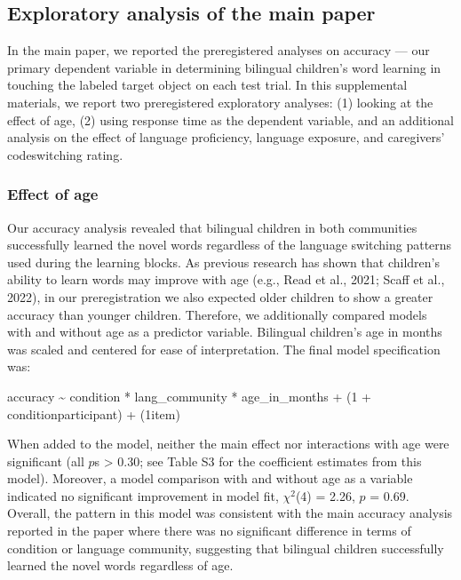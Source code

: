 \documentclass[
  man,floatsintext]{apa7}
\begin{document}
\hypertarget{exploratory-analysis-of-the-main-paper}{%
\subsection{Exploratory analysis of the main paper}\label{exploratory-analysis-of-the-main-paper}}

In the main paper, we reported the preregistered analyses on accuracy --- our primary dependent variable in determining bilingual children's word learning in touching the labeled target object on each test trial. In this supplemental materials, we report two preregistered exploratory analyses: (1) looking at the effect of age, (2) using response time as the dependent variable, and an additional analysis on the effect of language proficiency, language exposure, and caregivers' codeswitching rating.

\hypertarget{effect-of-age}{%
\subsubsection{Effect of age}\label{effect-of-age}}

Our accuracy analysis revealed that bilingual children in both communities successfully learned the novel words regardless of the language switching patterns used during the learning blocks. As previous research has shown that children's ability to learn words may improve with age (e.g., Read et al., 2021; Scaff et al., 2022), in our preregistration we also expected older children to show a greater accuracy than younger children. Therefore, we additionally compared models with and without age as a predictor variable. Bilingual children's age in months was scaled and centered for ease of interpretation. The final model specification was:

accuracy \textasciitilde{} condition * lang\_community * age\_in\_months + (1 + condition\textbar participant) + (1\textbar item)

\noindent When added to the model, neither the main effect nor interactions with age were significant (all \(p\)s \textgreater{} 0.30; see Table S3 for the coefficient estimates from this model). Moreover, a model comparison with and without age as a variable indicated no significant improvement in model fit, \(\chi^2\)(4) = 2.26, \(p\) = 0.69. Overall, the pattern in this model was consistent with the main accuracy analysis reported in the paper where there was no significant difference in terms of condition or language community, suggesting that bilingual children successfully learned the novel words regardless of age.
\end{document}
